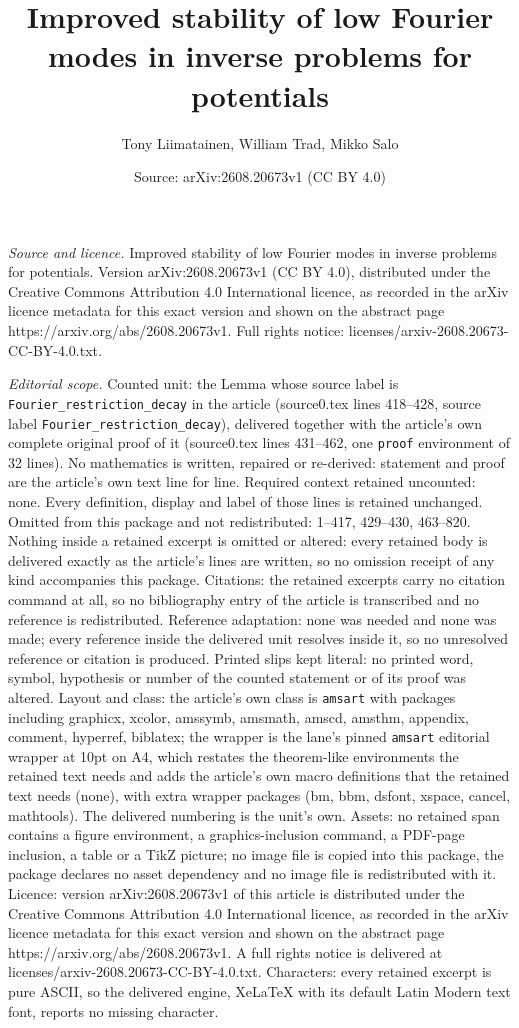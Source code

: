 \documentclass[10pt,a4paper]{amsart}
\title[Improved stability of low Fourier modes in inverse problems ]{Improved stability of low Fourier modes in inverse problems for potentials}
\author{Tony Liimatainen, William Trad, Mikko Salo}
\date{Source: arXiv:2608.20673v1 (CC BY 4.0)}
\begin{document}
\maketitle

\noindent\emph{Source and licence.} Improved stability of low Fourier modes in inverse problems for potentials. Version arXiv:2608.20673v1 (CC BY 4.0), distributed under the Creative Commons Attribution 4.0 International licence, as recorded in the arXiv licence metadata for this exact version and shown on the abstract page https://arxiv.org/abs/2608.20673v1. Full rights notice: licenses/arxiv-2608.20673-CC-BY-4.0.txt.\par\smallskip

\noindent\textit{Editorial scope.} Counted unit: the Lemma whose source label is \texttt{Fourier\_restriction\_decay} in the article (source0.tex lines 418--428, source label \texttt{Fourier\_restriction\_decay}), delivered together with the article's own complete original proof of it (source0.tex lines 431--462, one \texttt{proof} environment of 32 lines). No mathematics is written, repaired or re-derived: statement and proof are the article's own text line for line. Required context retained uncounted: none. Every definition, display and label of those lines is retained unchanged. Omitted from this package and not redistributed: 1--417, 429--430, 463--820. Nothing inside a retained excerpt is omitted or altered: every retained body is delivered exactly as the article's lines are written, so no omission receipt of any kind accompanies this package. Citations: the retained excerpts carry no citation command at all, so no bibliography entry of the article is transcribed and no reference is redistributed. Reference adaptation: none was needed and none was made; every reference inside the delivered unit resolves inside it, so no unresolved reference or citation is produced. Printed slips kept literal: no printed word, symbol, hypothesis or number of the counted statement or of its proof was altered. Layout and class: the article's own class is \texttt{amsart} with packages including graphicx, xcolor, amssymb, amsmath, amscd, amsthm, appendix, comment, hyperref, biblatex; the wrapper is the lane's pinned \texttt{amsart} editorial wrapper at 10pt on A4, which restates the theorem-like environments the retained text needs and adds the article's own macro definitions that the retained text needs (none), with extra wrapper packages (bm, bbm, dsfont, xspace, cancel, mathtools). The delivered numbering is the unit's own. Assets: no retained span contains a figure environment, a graphics-inclusion command, a PDF-page inclusion, a table or a TikZ picture; no image file is copied into this package, the package declares no asset dependency and no image file is redistributed with it. Licence: version arXiv:2608.20673v1 of this article is distributed under the Creative Commons Attribution 4.0 International licence, as recorded in the arXiv licence metadata for this exact version and shown on the abstract page https://arxiv.org/abs/2608.20673v1. A full rights notice is delivered at licenses/arxiv-2608.20673-CC-BY-4.0.txt. Characters: every retained excerpt is pure ASCII, so the delivered engine, XeLaTeX with its default Latin Modern text font, reports no missing character.
\end{document}
